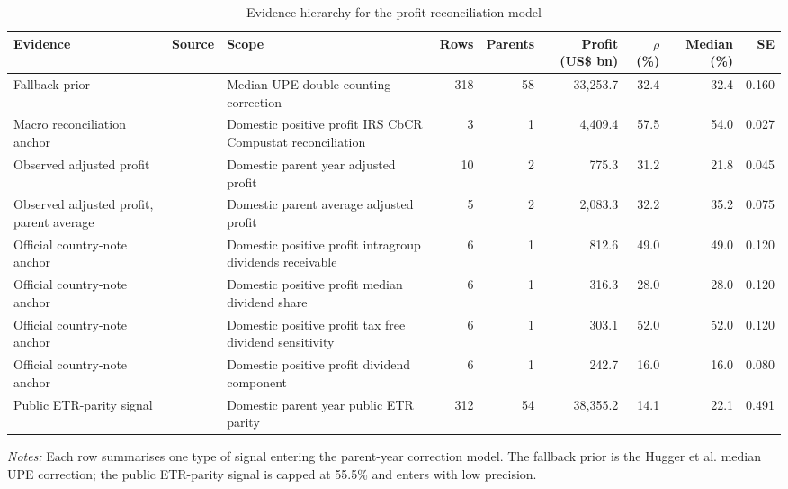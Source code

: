 \begin{table}[H]
\centering
\footnotesize
\setlength{\tabcolsep}{3pt}
\caption{Evidence hierarchy for the profit-reconciliation model}
\label{tab:profit_correction_evidence_table}
\begin{adjustbox}{max width=\textwidth,center}
\begin{tabular}{@{}L{2.8cm}L{1.8cm}L{3.4cm}rrrrrr@{}}
\toprule
Evidence & Source & Scope & Rows & Parents & Profit (US\$ bn) & $\rho$ (\%) & Median (\%) & SE \\
\midrule
Fallback prior & \citet{hugger2026} & Median UPE double counting correction & 318 & 58 & 33,253.7 & 32.4 & 32.4 & 0.160 \\
Macro reconciliation anchor & \citet{garcia-bernardo2022a} & Domestic positive profit IRS CbCR Compustat reconciliation &   3 &  1 &  4,409.4 & 57.5 & 54.0 & 0.027 \\
Observed adjusted profit & \citet{oecd2025a} & Domestic parent year adjusted profit &  10 &  2 &    775.3 & 31.2 & 21.8 & 0.045 \\
Observed adjusted profit, parent average & \citet{oecd2025a} & Domestic parent average adjusted profit &   5 &  2 &  2,083.3 & 32.2 & 35.2 & 0.075 \\
Official country-note anchor & \citet{godar2024} & Domestic positive profit intragroup dividends receivable &   6 &  1 &    812.6 & 49.0 & 49.0 & 0.120 \\
Official country-note anchor & \citet{godar2024} & Domestic positive profit median dividend share &   6 &  1 &    316.3 & 28.0 & 28.0 & 0.120 \\
Official country-note anchor & \citet{godar2024} & Domestic positive profit tax free dividend sensitivity &   6 &  1 &    303.1 & 52.0 & 52.0 & 0.120 \\
Official country-note anchor & \citet{godar2024} & Domestic positive profit dividend component &   6 &  1 &    242.7 & 16.0 & 16.0 & 0.080 \\
Public ETR-parity signal & \citet{hugger2026} & Domestic parent year public ETR parity & 312 & 54 & 38,355.2 & 14.1 & 22.1 & 0.491 \\
\bottomrule
\end{tabular}
\end{adjustbox}

\vspace{0.35em}
\noindent\begin{minipage}{\textwidth}
\footnotesize\raggedright\textit{Notes:} Each row summarises one type of signal entering the parent-year correction model. The fallback prior is the Hugger et al. median UPE correction; the public ETR-parity signal is capped at 55.5\% and enters with low precision.
\end{minipage}
\end{table}
